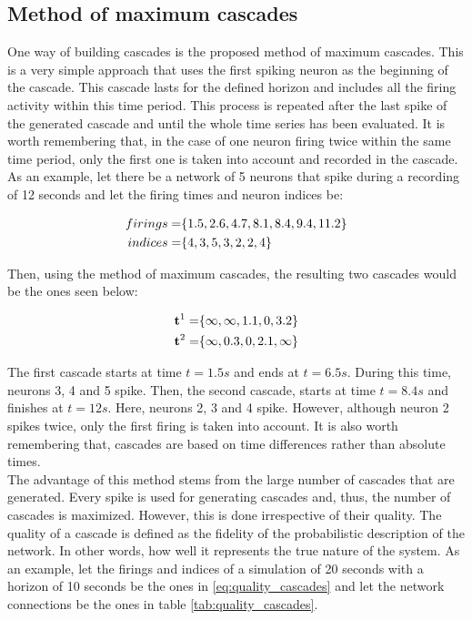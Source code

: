 \subsection{Method of maximum cascades}

One way of building cascades is the proposed method of maximum cascades. This is a very simple approach that uses the first spiking neuron as the beginning of the cascade. This cascade lasts for the defined horizon and includes all the firing activity within this time period. This process is repeated after the last spike of the generated cascade and until the whole time series has been evaluated. It is worth remembering that, in the case of one neuron firing twice within the same time period, only the first one is taken into account and recorded in the cascade. As an example, let there be a network of 5 neurons that spike during a recording of 12 seconds and let the firing times and neuron indices be:

\begin{align}
	\centering
	firings = &\{1.5, 2.6, 4.7, 8.1, 8.4, 9.4, 11.2\}\\
	indices = &\{4,  3,  5,  3,  2,  2, 4\}
\end{align}

Then, using the method of maximum cascades, the resulting two cascades would be the ones seen below:

\begin{align}
	\centering
	\textbf{t}^{1} = &\{\infty, \infty, 1.1, 0, 3.2 \}\\
	\textbf{t}^{2} = &\{\infty, 0.3, 0, 2.1, \infty \}
\end{align}

The first cascade starts at time \(t=1.5s\) and ends at \(t=6.5s\). During this time, neurons 3, 4 and 5 spike. Then, the second cascade, starts at time \(t=8.4s\) and finishes at \(t=12s\). Here, neurons 2, 3 and 4 spike. However, although neuron 2 spikes twice, only the first firing is taken into account. It is also worth remembering that, cascades are based on time differences rather than absolute times. \\

The advantage of this method stems from the large number of cascades that are generated. Every spike is used for generating cascades and, thus, the number of cascades is maximized. However, this is done irrespective of their quality. The quality of a cascade is defined as the fidelity of the probabilistic description of the network. In other words, how well it represents the true nature of the system. As an example, let the firings and indices of a simulation of 20 seconds with a horizon of 10 seconds be the ones in \ref{eq:quality_cascades} and let the network connections be the ones in table \ref{tab:quality_cascades}.


